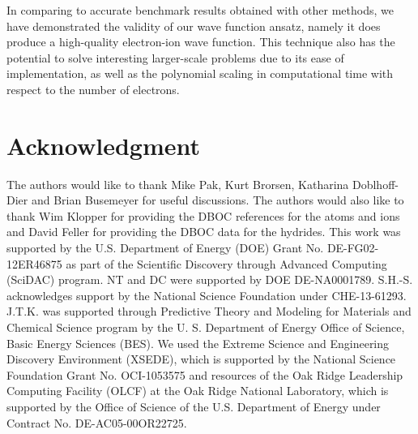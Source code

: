 \documentclass[aip,jcp,numerical,reprint]{revtex4-1}
\begin{document}
In comparing to accurate benchmark results obtained with other methods, we have demonstrated the validity of our wave function ansatz, namely it does produce a high-quality electron-ion wave function. This technique also has the potential to solve interesting larger-scale problems due to its ease of implementation, as well as the polynomial scaling in computational time with respect to the number of electrons.

\section{Acknowledgment}
The authors would like to thank Mike Pak, Kurt Brorsen, Katharina Doblhoff-Dier and Brian Busemeyer for useful discussions. The authors would also like to thank Wim Klopper for providing the DBOC references for the atoms and ions and David Feller for providing the DBOC data for the hydrides. This work was supported by the U.S. Department of Energy (DOE) Grant No. DE-FG02-12ER46875 as part of the Scientific Discovery through Advanced Computing (SciDAC) program. NT and DC were supported by DOE DE-NA0001789. S.H.-S. acknowledges support by the National Science Foundation under CHE-13-61293. J.T.K. was supported through Predictive Theory and Modeling for Materials and Chemical Science program by the U. S. Department of Energy Office of Science, Basic Energy Sciences (BES). We used the Extreme Science and Engineering Discovery Environment (XSEDE), which is supported by the National Science Foundation Grant No. OCI-1053575 and resources of the Oak Ridge Leadership Computing Facility (OLCF) at the Oak Ridge National Laboratory, which is supported by the Office of Science of the U.S. Department of Energy under Contract No. DE-AC05-00OR22725.


\end{document}
